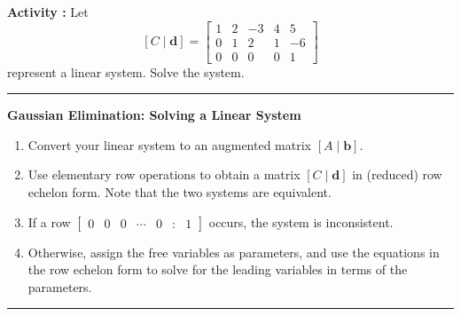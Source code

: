 \documentclass{article}
\newif\ifshowanswers
\newcommand{\answer}[2][4cm]{%
	\noindent\framebox[\textwidth]{%
		\begin{minipage}[t][#1][t]{\dimexpr\textwidth-2\fboxsep-2\fboxrule\relax}
			\ifshowanswers
			{\color{answercolor}#2\par}
			\fi
		\end{minipage}%
	}
}
\newcounter{commoncount}
\newcommand\activity{\refstepcounter{commoncount}\textbf{Activity \thecommoncount:} }
\newenvironment{framed}{\par\medskip\hrule\smallskip}
  {\par\smallskip\hrule\medskip}
\newcommand{\barray}[2]{{\left[ \begin{array}{#1} #2 \end{array} \right]}}
\newcommand{\bfb}{{\mathbf{b}}}
\newcommand{\bfd}{{\mathbf{d}}}
\newcommand*\dashline{\mathrel{\vert}}
\begin{document}
\answer[14cm]{
Matrix already in REF. Let $x_1,x_2,x_3,x_4,x_5$ be the variables.

From last row: $x_4 + 2x_5 = 9$.

From third row: $x_3 + 2x_4 + 3x_5 = 7$.

From second row: $x_2 + 2x_3 + 3x_4 - x_5 = 7$.

From first row: $x_1 + 2x_2 + 3x_3 + 4x_4 + 5x_5 = 6$.

\bigskip

Let $x_5 = t$ be parameter.

From last row: $x_4 = 9-2t$.

From third row: $x_3 = 7 - 2(9-2t) - 3t = -11+4t-3t = -11+t$.

From second row: $x_2 = 7 - 2(-11+t) - 3(9-2t) + t = 7+22-2t-27+6t+t = 2+5t$.

From first row: $x_1 = 6 - 2(2+5t) - 3(-11+t) - 4(9-2t) - 5t = 6-4-10t+33-3t-36+8t-5t = -1-10t$.

\bigskip

Solution: 
$x_1 = -1-10t$, $x_2 = 2+5t$, $x_3 = -11+t$, $x_4 = 9-2t$, $x_5 = t$
where $t$ is any real number
}

\newpage

\activity Let 
\[ 
[C \dashline \bfd] = 
\barray{rrrr|r}{
1 & 2 & -3 & 4 & 5 \\
0 & 1 & 2 & 1 & -6 \\
0 & 0 & 0 & 0 & 1
}
\]
represent a linear system. Solve the system.

\answer{
Last row shows $0x_1 + 0x_2 + 0x_3 + 0x_4 = 1$

This is impossible (0 cannot equal 1)

Therefore system is inconsistent---no solutions exist
}



\bigskip


\begin{framed}\textbf{Gaussian Elimination: Solving a Linear System}
\begin{enumerate}
    \item Convert your linear system to an augmented matrix $[A \dashline \bfb]$.
    \item Use elementary row operations to obtain a matrix $[C \dashline \bfd]$ in (reduced) row echelon form. Note that the two systems are equivalent. 
    \item If a row $\begin{bmatrix} 0 &  0 & 0  & \cdots & 0 & : & 1\end{bmatrix}$ occurs, the system is inconsistent.
    \item Otherwise, assign the free variables as parameters, and use the equations in the row echelon form to solve for the leading variables in terms of the parameters.
\end{enumerate}
\end{framed}
\end{document}
